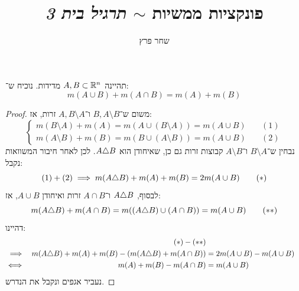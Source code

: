 \documentclass[]{../../../../tex/classes/homework}
\author{שחר פרץ}
\title{פונקציות ממשיות $\sim$ \textit{תרגיל בית 3}}
\begin{document}
	\maketitle
	\section{}
	תהיינה $A, B \subset \mathbb{R}^{n}$ מדידות. נוכיח ש־: 
	\[ m(A \cup B) + m(A \cap B) = m(A) + m(B) \]
	\begin{proof}
		משום ש־$B, A \setminus B$ ו־$A, B \setminus A$ זרות, אז: 
		\[ \begin{cases}
			m(B \setminus A) + m(A) = m(A \cup (B \setminus A)) = m(A \cup B) & \quad(1) \\ 
			m(A \setminus B) + m(B) = m(B \cup (A \setminus B)) = m(A \cup B) & \quad(2)
		\end{cases} \]
		נבחין ש־$B \setminus A$ ו־$A \setminus B$ קבוצות זרות גם כן, שאיחודן הוא $A \triangle B$. לכן לאחר חיבור המשוואות נקבל: 
		\[ (1) + (2) \implies m(A \triangle B) + m(A) + m(B) = 2m(A \cup B)\quad\quad (*) \]
		לבסוף, $A \triangle B$ ו־$A \cap B$ זרות ואיחודן $A \cup B$, אז: 
		\[ m(A \triangle B) + m(A \cap B) = m((A \triangle B) \cup (A \cap B)) = m(A \cup B) \quad\quad (**) \]
		דהיינו: 
		\begin{align*}
			&&(*)-(**) \\
			\implies &&m(A \triangle B) + m(A) + m(B) - \left ( m(A \triangle B) + m(A \cap B) \right ) &= 2m(A \cup B) - m(A \cup B) \\
			\iff && m(A) +m(B) - m(A \cap B) &=m(A \cup B)
		\end{align*}
		נעביר אגפים ונקבל את הנדרש. 
	\end{proof}
	
\end{document}
